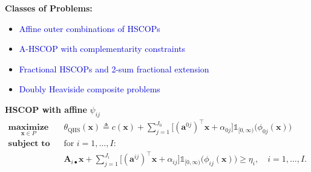 \documentclass[aspectratio=169,xcolor=dvipsnames]{beamer}
\begin{document}

\begin{frame}
  \textbf{Classes of Problems:}

  \vspace{0.35cm}
  \begin{itemize}
    \setlength{\itemsep}{0.32cm}
    \item \textcolor{MediumBlue}{Affine outer combinations of HSCOPs}
    \item \textcolor{MediumBlue}{A-HSCOP with complementarity constraints}
    \item \textcolor{MediumBlue}{Fractional HSCOPs and 2-sum fractional extension}
    \item \textcolor{MediumBlue}{Doubly Heaviside composite problems}
  \end{itemize}
\end{frame}

\begin{frame}
  \small
  \setlength{\abovedisplayskip}{6pt}
  \setlength{\belowdisplayskip}{6pt}

  \textbf{HSCOP with affine} $\psi_{ij}$
  \[
    \begin{aligned}
      \operatorname*{\textbf{maximize}}_{\mathbf{x}\in P}\quad
      &\theta_{\mathrm{QHS}}(\mathbf{x})\triangleq c(\mathbf{x})
        +\sum_{j=1}^{J_0}\bigl[(\mathbf{a}^{0j})^\top\mathbf{x}+\alpha_{0j}\bigr]
        \mathds{1}_{[0,\infty)}\bigl(\phi_{0j}(\mathbf{x})\bigr)\\[2pt]
      \operatorname*{\textbf{subject to}}\quad
      &\text{for }i=1,\ldots,I:\\[2pt]
      &\mathbf{A}_{i\bullet}\mathbf{x}
        +\sum_{j=1}^{J_i}\bigl[(\mathbf{a}^{ij})^\top\mathbf{x}+\alpha_{ij}\bigr]
        \mathds{1}_{[0,\infty)}\bigl(\phi_{ij}(\mathbf{x})\bigr)\geq\eta_i,
        \quad i=1,\ldots,I.
    \end{aligned}
  \]
\end{frame}
\end{document}
